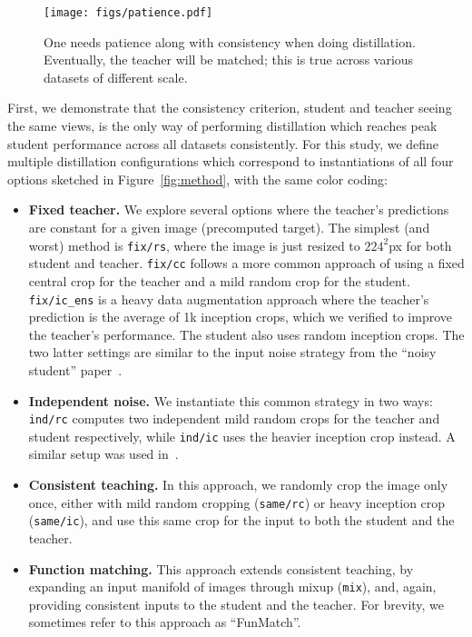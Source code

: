 \documentclass[10pt,twocolumn,letterpaper]{article}
\begin{document}
\begin{figure*}[t]\centering
    \texttt{[image: figs/patience.pdf]}\caption{One needs patience along with consistency when doing distillation. Eventually, the teacher will be matched; this is true across various datasets of different scale.}
    \label{fig:patience}\end{figure*}

First, we demonstrate that the consistency criterion, \ie student and teacher seeing the same views, is the only way of performing distillation which reaches peak student performance across all datasets consistently.
For this study, we define multiple distillation configurations which correspond to instantiations of all four options sketched in Figure~\ref{fig:method}, with the same color coding:
\begin{itemize}
    \item \textcolor{fixedcolor}{\bf Fixed teacher.} We explore several options where the teacher's predictions are constant for a given image (precomputed target).
    The simplest (and worst) method is {\tt fix/rs}, where the image is just resized to $224^2$px for both student and teacher. {\tt fix/cc} follows a more common approach of using a fixed central crop for the teacher and a mild random crop for the student.
    {\tt fix/ic\_ens} is a heavy data augmentation approach where the teacher's prediction is the average of 1k inception crops, which we verified to improve the teacher's performance. The student also uses random inception crops. The two latter settings are similar to the input noise strategy from the ``noisy student'' paper~\cite{xie2020self}.
    \item \textcolor{indepcolor}{\bf Independent noise.} We instantiate this common strategy in two ways: {\tt ind/rc} computes two independent mild random crops for the teacher and student respectively, while {\tt ind/ic} uses the heavier inception crop instead. A similar setup was used in~\cite{tarvainen2017mean}.
    \item \textcolor{consicolor}{\bf Consistent teaching.} In this approach, we randomly crop the image only once, either with mild random cropping ({\tt same/rc}) or heavy inception crop ({\tt same/ic}), and use this same crop for the input to both the student and the teacher.
    \item \textcolor{fnmatcolor}{\bf Function matching.} This approach extends consistent teaching, by expanding an input manifold of images through mixup ({\tt mix}), and, again, providing consistent inputs to the student and the teacher. \label{par:funcmatching}
    For brevity, we sometimes refer to this approach as ``FunMatch''.
\end{itemize}
\end{document}
